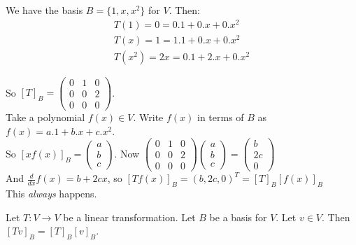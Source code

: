 \documentclass[twoside]{scrartcl}
\begin{document}
\begin{examples}
\begin{itemize}
We have the basis $B = \{1,x,x^2\}$ for $V$. Then:
\[
\begin{aligned}
T(1) = 0 = 0.1 + 0.x + 0.x^2 \\
T(x) = 1 = 1.1 + 0.x + 0.x^2 \\
T(x^2) = 2x = 0.1 + 2.x + 0.x^2
\end{aligned}\]


So $[T]_B = \begin{pmatrix}
 0 & 1 & 0 \\ 0 & 0 & 2 \\ 0 & 0 & 0
 \end{pmatrix}$.\\
 
 Take a polynomial $f(x) \in V$. Write $f(x)$ in terms of $B$ as $f(x) = a.1 + b.x + c.x^2$.\\
 
 So $[xf(x)]_B = \begin{pmatrix}
 a \\ b \\ c
 \end{pmatrix}
$. Now $\begin{pmatrix}
 0 & 1 & 0 \\ 0 & 0 & 2 \\ 0 & 0 & 0

\end{pmatrix}\begin{pmatrix} 
a \\ b \\ c
\end{pmatrix} = \begin{pmatrix}
 b \\ 2c \\ 0
 \end{pmatrix}$\\
 
 And $\frac{d}{dx} f(x) = b + 2cx$, so $[Tf(x)]_B = (b, 2c, 0)^T = [T]_B[f(x)]_B$\\
 This \emph{always} happens. 
\end{itemize}
\end{examples}\vspace*{10pt}

\begin{proposition} Let $T: V \to V$ be a linear transformation. Let $B$ be a basis for $V$. Let $v \in V$. Then $[Tv]_B = [T]_B[v]_B$. 	
\end{proposition}
\end{document}
